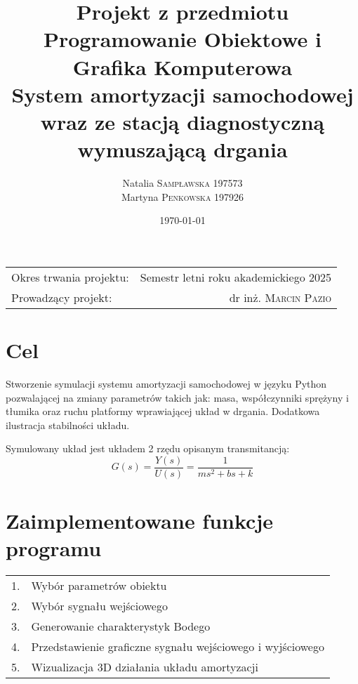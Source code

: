 \documentclass[10pt, a4paper]{article}
\title{
  \textbf{Projekt z przedmiotu Programowanie Obiektowe i Grafika Komputerowa
} \\
  \large System amortyzacji samochodowej wraz ze stacją diagnostyczną wymuszającą drgania
}
\author{
  Natalia \textsc{Sampławska 197573} \\
  Martyna \textsc{Penkowska 197926}
}
\date{\today}
\begin{document}
\maketitle

\begin{center}
  \begin{tabular}{l r}
    Okres trwania projektu: & Semestr letni roku akademickiego 2025 \\
    Prowadzący projekt: & dr inż. \textsc{Marcin Pazio}
  \end{tabular}
\end{center}

\vspace{0.1cm}


\section{Cel}

Stworzenie symulacji systemu amortyzacji samochodowej w języku Python pozwalającej na zmiany parametrów takich jak: masa, współczynniki sprężyny i tłumika oraz ruchu platformy wprawiającej układ w drgania. Dodatkowa ilustracja stabilności układu. 

\vspace{0.1cm}
Symulowany układ jest układem 2 rzędu opisanym transmitancją:
\[
G(s) = \frac{Y(s)}{U(s)} = \frac{1}{m s^2 + b s + k}
\]


\section{Zaimplementowane funkcje programu}


\begin{tabular}{l l}
	1. & Wybór parametrów obiektu\\ 
	2. & Wybór sygnału wejściowego\\
	3. & Generowanie charakterystyk Bodego\\
	4. & Przedstawienie graficzne sygnału wejściowego i wyjściowego\\
	5. & Wizualizacja 3D działania układu amortyzacji\\
\end{tabular}
\end{document}
